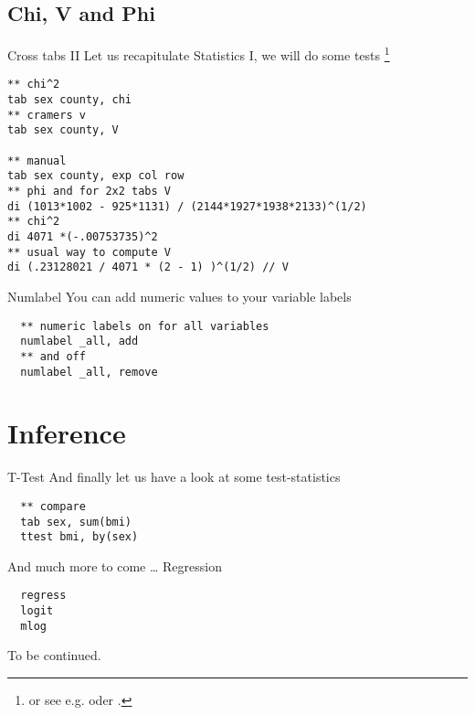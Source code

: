 \subsection{Chi, V and Phi}
\begin{frame}[fragile]{Cross tabs II}         
Let us recapitulate Statistics I, we will do some tests \footnote{or see e.g. \textcite{Krebs10} oder \textcite{Agresti09}.}
\begin{lstlisting}
** chi^2
tab sex county, chi
** cramers v
tab sex county, V

** manual
tab sex county, exp col row
** phi and for 2x2 tabs V
di (1013*1002 - 925*1131) / (2144*1927*1938*2133)^(1/2) 
** chi^2
di 4071 *(-.00753735)^2
** usual way to compute V
di (.23128021 / 4071 * (2 - 1) )^(1/2) // V
\end{lstlisting}
\end{frame}

\begin{frame}[fragile]{Numlabel}
You can add numeric values to your variable labels 
\begin{lstlisting}
  ** numeric labels on for all variables
  numlabel _all, add
  ** and off
  numlabel _all, remove
\end{lstlisting}
\end{frame}

\section{Inference}
\begin{frame}[fragile]{T-Test}  
And finally let us have a look at some test-statistics
\begin{lstlisting}
  ** compare 
  tab sex, sum(bmi)
  ttest bmi, by(sex)
\end{lstlisting}
\end{frame}

\begin{frame}[fragile]{And much more to come \dots}   
Regression
\begin{lstlisting}
  regress
  logit
  mlog
\end{lstlisting}
\end{frame}

\begin{frame}
\thispagestyle{empty}
 To be continued.
\end{frame}
